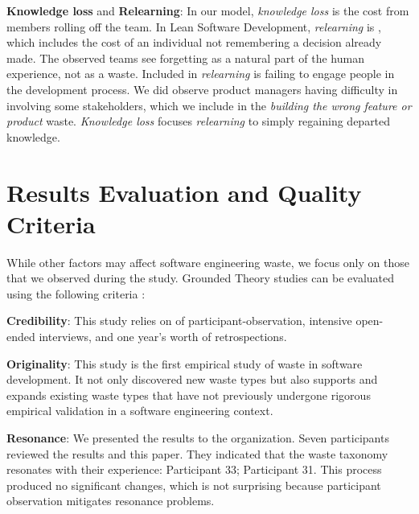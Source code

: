 \textbf{Knowledge loss} and \textbf{Relearning}:
In our model, \textit{knowledge loss} is the cost from members rolling off the team. In Lean Software Development, \textit{relearning} is  \cite{PoppendieckConceptToCash}, which includes the cost of an individual not remembering a decision already made. The observed teams see forgetting as a natural part of the human experience, not as a waste.  Included in \textit{relearning} is failing to engage people in the development process. We did observe product managers having difficulty in involving some stakeholders, which we include in the \textit{building the wrong feature or product} waste. \textit{Knowledge loss} focuses \textit{relearning} to simply regaining departed knowledge. 
\section{Results Evaluation and Quality Criteria}
\label{ResultsEvaluation}
While other factors may affect software engineering waste, we focus only on those that we observed during the study. Grounded Theory studies can be evaluated using the following criteria \cite{Charmaz, StolGroundedTheory}:

\textbf{Credibility}:   This study relies on \durationOfResearchStudyPlural{} of participant-observation, \numberOfInterviews{} intensive open-ended interviews, and one year's worth of retrospections. 

\textbf{Originality}:   This study is the first empirical study of waste in software development. It not only discovered new waste types but also supports and expands existing waste types that have not previously undergone rigorous empirical validation in a software engineering context. 

\textbf{Resonance}:  We presented the results to the organization. Seven participants reviewed the results and this paper. They indicated that the waste taxonomy resonates with their experience:  \textemdash Participant 33;  \textemdash Participant 31. This process produced no significant changes, which is not surprising because participant observation mitigates resonance problems.


